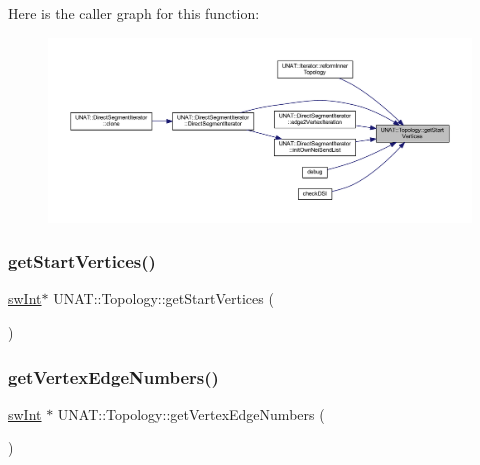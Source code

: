 Here is the caller graph for this function\+:
\nopagebreak
\begin{figure}[H]
\begin{center}
\leavevmode
\includegraphics[width=350pt]{classUNAT_1_1Topology_ade1737d852cde9f4d691b325dfd20c36_icgraph}
\end{center}
\end{figure}
\mbox{\label{classUNAT_1_1Topology_aa1de517c63444c3fd56d97fc99df2294}} 
\subsubsection{\texorpdfstring{getStartVertices()}{getStartVertices()}\hspace{0.1cm}{\footnotesize\ttfamily [3/3]}}
{\footnotesize\ttfamily \mbox{\hyperlink{include_2swMacro_8h_a113cf5f6b5377cdf3fac6aa4e443e9aa}{sw\+Int}}$\ast$ U\+N\+A\+T\+::\+Topology\+::get\+Start\+Vertices (\begin{DoxyParamCaption}{ }\end{DoxyParamCaption})}

\mbox{\label{classUNAT_1_1Topology_a5b25e62c756c7c70658e92f8ef87d133}} 
\subsubsection{\texorpdfstring{getVertexEdgeNumbers()}{getVertexEdgeNumbers()}\hspace{0.1cm}{\footnotesize\ttfamily [1/3]}}
{\footnotesize\ttfamily \mbox{\hyperlink{include_2swMacro_8h_a113cf5f6b5377cdf3fac6aa4e443e9aa}{sw\+Int}} $\ast$ U\+N\+A\+T\+::\+Topology\+::get\+Vertex\+Edge\+Numbers (\begin{DoxyParamCaption}{ }\end{DoxyParamCaption})}

